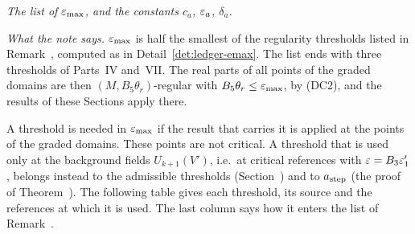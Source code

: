 \begin{detail}\label{det:ledger-emax-list}
\emph{The list of $\varepsilon_{\max}$, and the constants $c_a$, $\varepsilon_a$, $\delta_a$.}

\emph{What the note says.} $\varepsilon_{\max}$ is half the smallest of the regularity thresholds listed in Remark~, computed as in Detail~\ref{det:ledger-emax}. The list ends with three thresholds of Parts~IV and~VII. The real parts of all points of the graded domains are then $(M,B_5\theta_r)$-regular with $B_5\theta_r\le\varepsilon_{\max}$, by (DC2), and the results of these Sections apply there.

\begin{step}
A threshold is needed in $\varepsilon_{\max}$ if the result that carries it is applied at the points of the graded domains. These points are not critical. A threshold that is used only at the background fields $U_{k+1}(V')$, i.e.\ at critical references with $\varepsilon=B_3\varepsilon'_1$, belongs instead to the admissible thresholds (Section~) and to $a_{\rm step}$ (the proof of Theorem~). The following table gives each threshold, its source and the references at which it is used. The last column says how it enters the list of Remark~.


\end{step}
\end{detail}
